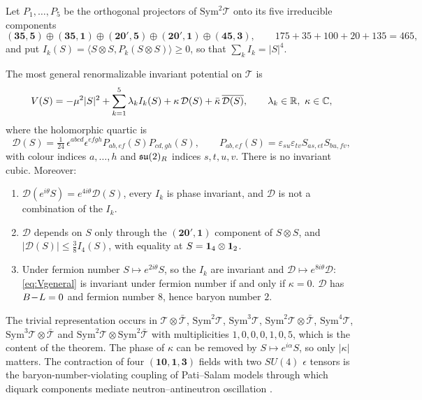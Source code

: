 Let $P_1,\dots,P_5$ be the orthogonal projectors of $\mathrm{Sym}^2\mathcal T$ onto its five irreducible components
\[
(\mathbf{35},\mathbf5)\oplus(\mathbf{35},\mathbf1)\oplus(\mathbf{20}',\mathbf5)\oplus(\mathbf{20}',\mathbf1)\oplus(\mathbf{45},\mathbf3),\qquad 175+35+100+20+135=465,
\]
and put $I_k(S)=\langle S\otimes S,P_k(S\otimes S)\rangle\ge0$, so that $\sum_kI_k=|S|^4$.

\begin{theorem}
\label{thm:potential}
The most general renormalizable invariant potential on $\mathcal T$ is
\begin{equation}
\label{eq:Vgeneral}
V(S)=-\mu^2|S|^2+\sum_{k=1}^5\lambda_kI_k(S)+\kappa\,\mathcal D(S)+\bar\kappa\,\overline{\mathcal D(S)},\qquad \lambda_k\in\R,\ \kappa\in\C,
\end{equation}
where the holomorphic quartic is
\[
\mathcal D(S)=\tfrac1{24}\,\epsilon^{abcd}\epsilon^{efgh}P_{ab,ef}(S)P_{cd,gh}(S),\qquad P_{ab,ef}(S)=\varepsilon_{su}\varepsilon_{tv}S_{as,et}S_{bu,fv},
\]
with colour indices $a,\dots,h$ and $\mathfrak{su}(2)_R$ indices $s,t,u,v$. There is no invariant cubic. Moreover:
\begin{enumerate}[label=(\roman*),leftmargin=2.2em]
\item $\mathcal D(e^{i\theta}S)=e^{4i\theta}\mathcal D(S)$, every $I_k$ is phase invariant, and $\mathcal D$ is not a combination of the $I_k$.
\item $\mathcal D$ depends on $S$ only through the $(\mathbf{20}',\mathbf1)$ component of $S\otimes S$, and $|\mathcal D(S)|\le\tfrac38I_4(S)$, with equality at
$S=\mathbf 1_4\otimes\mathbf 1_2$.
\item Under fermion number $S\mapsto e^{2i\theta}S$, so the $I_k$ are invariant and $\mathcal D\mapsto e^{8i\theta}\mathcal D$: \eqref{eq:Vgeneral} is invariant
under fermion number if and only if $\kappa=0$. $\mathcal D$ has $B\!-\!L=0$ and fermion number $8$, hence baryon number $2$.
\end{enumerate}
\end{theorem}

The trivial representation occurs in $\mathcal T\otimes\bar{\mathcal T}$, $\mathrm{Sym}^2\mathcal T$, $\mathrm{Sym}^3\mathcal T$, $\mathrm{Sym}^2\mathcal T\otimes\bar{\mathcal T}$,
$\mathrm{Sym}^4\mathcal T$, $\mathrm{Sym}^3\mathcal T\otimes\bar{\mathcal T}$ and $\mathrm{Sym}^2\mathcal T\otimes\mathrm{Sym}^2\bar{\mathcal T}$ with multiplicities $1,0,0,0,1,0,5$,
which is the content of the theorem. The phase of $\kappa$ can be removed by $S\mapsto e^{i\alpha}S$, so only $|\kappa|$ matters. The contraction of four
$(\mathbf{10},\mathbf1,\mathbf3)$ fields with two $SU(4)$ $\epsilon$ tensors is the baryon-number-violating coupling of Pati--Salam models through which diquark
components mediate neutron--antineutron oscillation \cite{MohapatraMarshak80,ChackoMohapatra99}.

